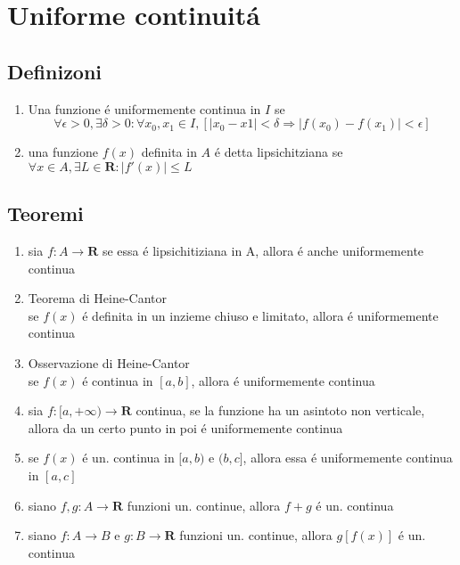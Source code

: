 \documentclass{exam}
\begin{document}
\section{Uniforme continuit\'a}
  \subsection{Definizoni}
    \begin{enumerate}
      \item
        Una funzione \'e uniformemente continua in $I$ se
        \begin{equation}
         \forall \epsilon >0, \exists \delta >0 : \forall x_{0},x_{1} \in I,[|x_{0}-x{1}|<\delta \Rightarrow |f(x_{0})-f(x_{1})|<\epsilon]
        \end{equation}
      \item
       una funzione $f(x)$ definita in $A$ \'e detta lipsichitziana se $ \forall x\in A,\exists L\in \mathbf{R}:|f'(x)|\le L$
  \end{enumerate}


  \subsection{Teoremi}
    \begin{enumerate}
      \item
        sia $f:A\rightarrow \mathbf{R}$ se essa \'e lipsichitiziana in A, allora \'e anche uniformemente continua
      \item{Teorema di Heine-Cantor}\\
        se $f(x)$ \'e definita in un inzieme chiuso e limitato, allora \'e uniformemente continua
      \item{Osservazione di Heine-Cantor}\\
        se $f(x)$ \'e continua in $[a,b]$, allora \'e uniformemente continua
      \item
        sia $f:[a,+\infty)\rightarrow \mathbf{R}$ continua, se la funzione ha un asintoto non verticale, allora da un certo punto in poi \'e uniformemente continua
      \item
        se $f(x)$ \'e un. continua in $[a,b)$ e $(b,c]$, allora essa \'e uniformemente continua in $[a,c]$
      \item
        siano $f,g:A\rightarrow \mathbf{R}$ funzioni un. continue, allora $f+g$ \'e un. continua
      \item
        siano $f:A\rightarrow B$ e $g:B\rightarrow \mathbf{R}$ funzioni un. continue, allora $g[f(x)]$ \'e un. continua
    \end{enumerate}    
  \newpage
\end{document}
